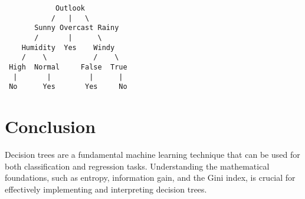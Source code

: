 \documentclass[12pt]{article}
\begin{document}
\begin{verbatim}
            Outlook
           /   |   \
       Sunny Overcast Rainy
       /       |      \
    Humidity  Yes    Windy
    /    \           /    \
 High  Normal     False  True
  |       |         |      |
 No      Yes       Yes     No
\end{verbatim}

\section{Conclusion}
Decision trees are a fundamental machine learning technique that can be used for both classification and regression tasks. Understanding the mathematical foundations, such as entropy, information gain, and the Gini index, is crucial for effectively implementing and interpreting decision trees.
\end{document}
